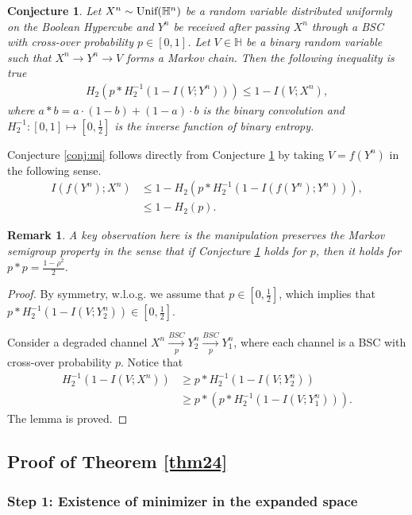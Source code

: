 \documentclass[conference,letterpaper,onecolumn]{IEEEtran}
\theoremstyle{plain}%
\newtheorem{rem}{Remark}
\newcommand{\unif}{\textnormal{Unif}}
\newtheorem{conj}{Conjecture}
\begin{document}
\begin{conj}
\label{conj:extended}
    Let $X^n\sim\unif{(\mathbb{H}^n)}$ be a random variable distributed uniformly on the Boolean Hypercube and $Y^n$ be received after passing $X^n$ through a BSC with cross-over probability $p \in [0,1]$. Let $V \in \mathbb{H}$ be a binary random variable such that $X^n \to Y^n \to V$ forms a Markov chain. Then the following inequality is true
    \begin{align*}
       H_2(p \ast H_2^{-1}(1 - I(V;Y^n))) \leq 1 - I(V;X^n),
   \end{align*}
   where $a\ast b = a\cdot(1-b) + (1-a)\cdot b$ is the binary convolution and $H_2^{-1} : [0,1] \mapsto \left[0,\frac{1}{2}\right]$ is the inverse function of binary entropy.
\end{conj}
Conjecture \ref{conj:mi} follows directly from Conjecture \ref{conj:extended} by taking $V = f(Y^n)$ in the following sense.
\begin{align*}
    I(f(Y^n);X^n) &\leq 1 - H_2(p \ast H_2^{-1}(1 - I(f(Y^n);Y^n))), \\
    &\leq 1 - H_2(p).
\end{align*}
\begin{rem}
    A key observation here is the manipulation preserves the Markov semigroup property in the sense that if Conjecture \ref{conj:extended} holds for $p$, then it holds for $p\ast p = \frac{1 - \rho^2}{2}$.
\end{rem}
\begin{proof}
    By symmetry, w.l.o.g. we assume that $p\in\left[0,\frac{1}{2}\right]$, which implies that $p \ast H_2^{-1}(1 - I(V;Y_2^n)) \in \left[0,\frac{1}{2}\right]$.
    
    Consider a degraded channel $X^n \xrightarrow[p]{BSC} Y^n_2 \xrightarrow[p]{BSC} Y^n_1$, where each channel is a BSC with cross-over probability $p$. Notice that
    \begin{align*}
        H_2^{-1}(1 - I(V;X^n))&\geq p \ast H_2^{-1}(1 - I(V;Y_2^n))\\
        &\geq p\ast(p\ast H_2^{-1}(1 - I(V;Y^n_1))).
    \end{align*}
    The lemma is proved.
\end{proof}

\fi

\subsection{Proof of Theorem \ref{thm24}}
\subsubsection{Step 1: Existence of minimizer in the expanded space}
\end{document}
